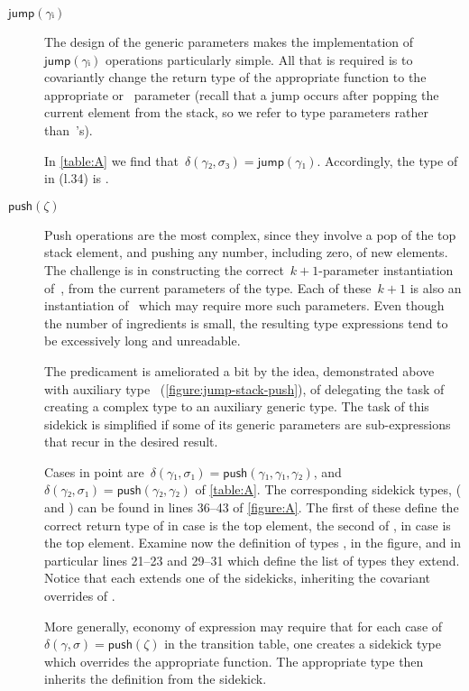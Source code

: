 \begin{description}
  \item[$\textsf{jump}(γᵢ)$]
  The design of the generic parameters makes the implementation of~$\textsf{jump}(γᵢ)$
    operations particularly simple.
  All that is required is to covariantly change the return type of the
    appropriate  function to the appropriate  or~ parameter
    (recall that a jump occurs after popping the current element from the stack, so %
    we refer to  type parameters rather than~'s).
  \par
  In \cref{table:A} we find that~$δ(γ₂,σ₃) =\textsf{jump}(γ₁)$. 
  Accordingly, the type of  in  (l.34) is .

  \item[$\textsf{push}(ζ)$]
  Push operations are the most complex, since they involve a pop of the top stack element,
    and pushing any number, including zero, of new elements.
  The challenge is in constructing the correct~$k+1$-parameter instantiation of~,
    from the current parameters of the type.
  Each of these~$k+1$ is also an instantiation of~ which may require more such
    parameters.
  Even though the number of ingredients is small, the resulting type expressions
    tend to be excessively long and unreadable.
  \par
  The predicament is ameliorated a bit by the idea,
    demonstrated above with auxiliary type~
    (\cref{figure:jump-stack-push}),
    of delegating the task of creating a complex type to an auxiliary
    generic type.
  The task of this sidekick is simplified if some of its generic
  parameters are sub-expressions that recur in the desired
  result.
  \par
  Cases in point
    are~$δ(γ₁,σ₁)=\textsf{push}(γ₁,γ₁,γ₂)$, and~$δ(γ₂,σ₁)=\textsf{push}(γ₂,γ₂)$ of \cref{table:A}.
  The corresponding sidekick types,
    ( and )
    can be found in lines 36--43 of \cref{figure:A}.
  The first of these define the correct return type
    of  in case  is the top element,
    the second of , in case  is the top element.
  Examine now the definition of types , in the figure,
    and in particular lines 21--23 and 29--31 which define the list of types they extend.
  Notice that each extends one of the sidekicks, inheriting the covariant
    overrides of .
  \par
  More generally, economy of expression may require that for each case
    of~$δ(γ,σ)=\textsf{push}(ζ)$ in the transition table,
    one creates a sidekick type which overrides the appropriate 
    function.
  The appropriate  type then inherits the definition
    from the sidekick.
\end{description}


